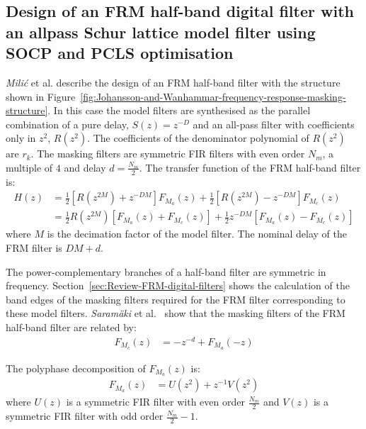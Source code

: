 \documentclass[a4paper,twoside,10pt,english]{report}
\begin{document}
\subsection{\label{sec:Design-half-band-FRM-allpass-model-filter-Schur-lattice}Design of an FRM half-band digital filter with an allpass Schur lattice model filter using SOCP and PCLS optimisation}
\emph{Mili\'{c}} et al. describe the design of an FRM half-band filter with
the structure shown in
Figure~\ref{fig:Johansson-and-Wanhammar-frequency-response-masking-structure}.
In this case the model filters are synthesised as the parallel combination of
a pure delay, $S\left(z\right)=z^{-D}$ and an all-pass filter with
coefficients only in $z^{2}$, $R\left(z^{2}\right)$. The coefficients of the
denominator polynomial of $R\left(z^{2}\right)$ are $r_{k}$. The masking filters
are symmetric FIR filters with even order $N_{m}$, a multiple of $4$ and delay
$d=\frac{N_{m}}{2}$. The transfer function of the FRM half-band filter is:
\begin{align*}
H\left(z\right)&=
\frac{1}{2}\left[R\left(z^{2M}\right)+z^{-DM}\right]F_{M_{a}}\left(z\right)+
\frac{1}{2}\left[R\left(z^{2M}\right)-z^{-DM}\right]F_{M_{c}}\left(z\right) \\
&=\frac{1}{2}R\left(z^{2M}\right)
\left[F_{M_{a}}\left(z\right)+F_{M_{c}}\left(z\right)\right] +
\frac{1}{2}z^{-DM}\left[F_{M_{a}}\left(z\right)-F_{M_{c}}\left(z\right)\right]
\end{align*}
where $M$ is the decimation factor of the model filter. The nominal delay of
the FRM filter is $DM+d$.

The power-complementary branches of a half-band filter are symmetric in 
frequency. Section~\ref{sec:Review-FRM-digital-filters} shows the calculation
of the band edges of the masking filters required for the FRM filter 
corresponding to these model filters. \emph{Saram\"{a}ki} et 
al.~\cite[Figure 2]{SaramakiLimYang_SynthesisHalfBandFRM} show that the
masking filters of the FRM half-band filter are related by:
\begin{align*}
F_{M_{c}}\left(z\right)&=-z^{-d}+F_{M_{a}}\left(-z\right)
\end{align*}

The polyphase decomposition of $F_{M_{a}}\left(z\right)$ is:
\begin{align*}
F_{M_{a}}\left(z\right)&=U\left(z^{2}\right)+z^{-1}V\left(z^{2}\right)
\end{align*}
where $U\left(z\right)$ is a symmetric FIR filter with even order 
$\frac{N_{m}}{2}$ and $V\left(z\right)$ is a symmetric FIR filter with odd 
order $\frac{N_{m}}{2}-1$.
\end{document}
